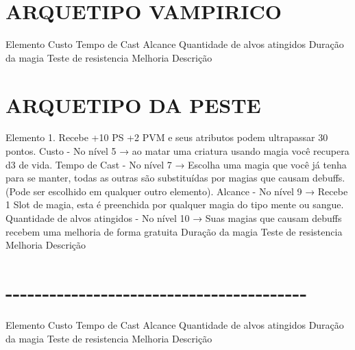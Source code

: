 \documentclass{article}%
\begin{document}
%
\section{ARQUETIPO VAMPIRICO}%
\label{sec:ARQUETIPOVAMPIRICO}%
Elemento \newline%
Custo \newline%
Tempo de Cast \newline%
Alcance \newline%
Quantidade de alvos atingidos \newline%
Duração da magia \newline%
Teste de resistencia \newline%
Melhoria \newline%
Descrição \newline%

%
\section{ARQUETIPO DA PESTE}%
\label{sec:ARQUETIPODAPESTE}%
Elemento 1. Recebe +10 PS +2 PVM e seus atributos podem ultrapassar 30 pontos.\newline%
Custo {-} No nível 5 → ao matar uma criatura usando magia você recupera d3 de vida.\newline%
Tempo de Cast {-} No nível 7 → Escolha uma magia que você já tenha para se manter, todas as outras são substituídas por magias que causam debuffs. (Pode ser escolhido em qualquer outro elemento).\newline%
Alcance {-} No nível 9 → Recebe 1 Slot de magia, esta é preenchida por qualquer magia do tipo mente ou sangue.\newline%
Quantidade de alvos atingidos {-} No nível 10 → Suas magias que causam debuffs recebem uma melhoria de forma gratuita\newline%
Duração da magia \newline%
Teste de resistencia \newline%
Melhoria \newline%
Descrição \newline%

%
\section{{-}{-}{-}{-}{-}{-}{-}{-}{-}{-}{-}{-}{-}{-}{-}{-}{-}{-}{-}{-}{-}{-}{-}{-}{-}{-}{-}{-}{-}{-}{-}{-}{-}{-}{-}{-}{-}{-}{-}{-}{-}}%
\label{sec:{-}{-}{-}{-}{-}{-}{-}{-}{-}{-}{-}{-}{-}{-}{-}{-}{-}{-}{-}{-}{-}{-}{-}{-}{-}{-}{-}{-}{-}{-}{-}{-}{-}{-}{-}{-}{-}{-}{-}{-}{-}}%
Elemento \newline%
Custo \newline%
Tempo de Cast \newline%
Alcance \newline%
Quantidade de alvos atingidos \newline%
Duração da magia \newline%
Teste de resistencia \newline%
Melhoria \newline%
Descrição \newline%
\end{document}
